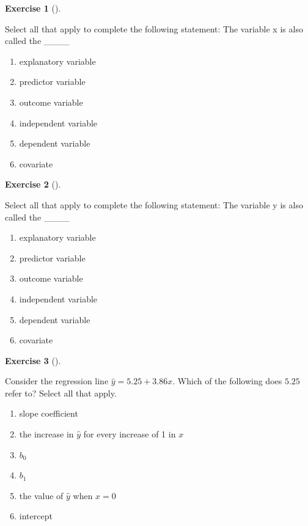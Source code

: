 \documentclass[
  letterpaper,
  DIV=11,
  numbers=noendperiod]{scrreprt}
\providecommand{\tightlist}{%
  \setlength{\itemsep}{0pt}\setlength{\parskip}{0pt}}\usepackage{longtable,booktabs,array}
\theoremstyle{definition}
\newtheorem{exercise}{Exercise}[chapter]
\theoremstyle{remark}
\begin{document}
\begin{exercise}[]\protect\hypertarget{exr-ch05-c04}{}\label{exr-ch05-c04}

Select all that apply to complete the following statement: The variable
x is also called the \_\_\_\_

\begin{enumerate}
\def\labelenumi{\alph{enumi})}
\tightlist
\item
  explanatory variable
\item
  predictor variable
\item
  outcome variable
\item
  independent variable
\item
  dependent variable
\item
  covariate
\end{enumerate}

\end{exercise}

\begin{exercise}[]\protect\hypertarget{exr-ch05-c05}{}\label{exr-ch05-c05}

Select all that apply to complete the following statement: The variable
y is also called the \_\_\_\_

\begin{enumerate}
\def\labelenumi{\alph{enumi})}
\tightlist
\item
  explanatory variable
\item
  predictor variable
\item
  outcome variable
\item
  independent variable
\item
  dependent variable
\item
  covariate
\end{enumerate}

\end{exercise}

\begin{exercise}[]\protect\hypertarget{exr-ch05-c06}{}\label{exr-ch05-c06}

Consider the regression line \(\hat{y}=5.25+3.86x\). Which of the
following does \(5.25\) refer to? Select all that apply.

\begin{enumerate}
\def\labelenumi{\alph{enumi})}
\tightlist
\item
  slope coefficient
\item
  the increase in \(\hat{y}\) for every increase of 1 in \(x\)
\item
  \(b_0\)
\item
  \(b_1\)
\item
  the value of \(\hat{y}\) when \(x=0\)
\item
  intercept
\end{enumerate}

\end{exercise}
\end{document}

